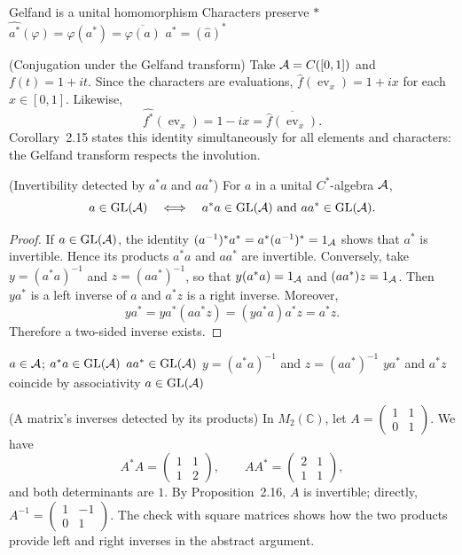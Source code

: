 \proofdiagram
{Gelfand is a unital homomorphism}
{Characters preserve $*$}
{$\widehat{a^*}(\varphi)=\varphi(a^*)=\overline{\varphi(a)}$}
{$\widehat{a^*}=(\widehat a)^*$}

\begin{cthejemplo}{(Conjugation under the Gelfand transform)}
Take $\mathcal A=C([0,1])$ and $f(t)=1+it$. Since the characters are evaluations,
$\widehat f(\operatorname{ev}_x)=1+ix$ for each $x\in[0,1]$. Likewise,
\[
 \widehat{f^*}(\operatorname{ev}_x)=1-ix
 =\overline{\widehat f(\operatorname{ev}_x)}.
\]
Corollary~2.15 states this identity simultaneously for all elements and
characters: the Gelfand transform respects the involution.
\end{cthejemplo}

\begin{cthproposicion}{(Invertibility detected by $a^*a$ and $aa^*$)}
For $a$ in a unital $C^*$-algebra $\mathcal A$,
\[
 a\in\operatorname{GL}(\mathcal A)
 \quad\Longleftrightarrow\quad
 a^*a\in\operatorname{GL}(\mathcal A)\text{ and }aa^*\in\operatorname{GL}(\mathcal A).
\]
\end{cthproposicion}

\begin{proof}[Proof]
If $a\in\operatorname{GL}(\mathcal A)$, the identity
$(a^{-1})^*a^*=a^*(a^{-1})^*=1_\mathcal A$ shows that $a^*$ is invertible.
Hence its products $a^*a$ and $aa^*$ are invertible. Conversely, take
$y=(a^*a)^{-1}$ and $z=(aa^*)^{-1}$, so that
$y(a^*a)=1_\mathcal A$ and $(aa^*)z=1_\mathcal A$. Then $ya^*$ is a left inverse of $a$ and
$a^*z$ is a right inverse. Moreover,
\[
 ya^*=ya^*(aa^*z)=(ya^*a)a^*z=a^*z.
\]
Therefore a two-sided inverse exists.
\end{proof}

\proofdiagrambranch
{$a\in\mathcal A$; $a^*a\in\operatorname{GL}(\mathcal A)$}
{$aa^*\in\operatorname{GL}(\mathcal A)$}
{$y=(a^*a)^{-1}$ and $z=(aa^*)^{-1}$}
{$ya^*$ and $a^*z$ coincide by associativity}
{$a\in\operatorname{GL}(\mathcal A)$}

\begin{cthejemplo}{(A matrix's inverses detected by its products)}
In $M_2(\mathbb C)$, let
$A=\begin{pmatrix}1&1\\0&1\end{pmatrix}$. We have
\[
 A^*A=\begin{pmatrix}1&1\\1&2\end{pmatrix},
 \qquad
 AA^*=\begin{pmatrix}2&1\\1&1\end{pmatrix},
\]
and both determinants are $1$. By Proposition~2.16, $A$ is invertible;
directly, $A^{-1}=\begin{pmatrix}1&-1\\0&1\end{pmatrix}$.
The check with square matrices shows how the two products provide left
and right inverses in the abstract argument.
\end{cthejemplo}


